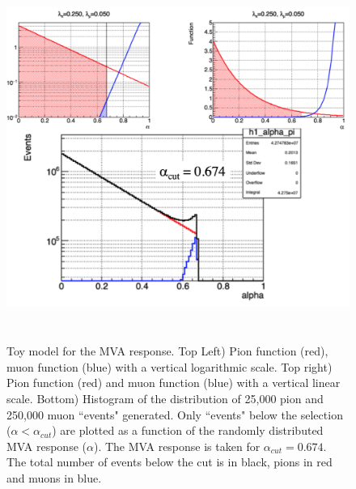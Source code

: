\documentclass[12pt]{article}
\begin{document}
\begin{figure}[tbph]
\begin{center}
\includegraphics[height=12cm,clip=true]{toy_systematics_c1}
\caption{Toy model for the MVA response. Top Left) Pion function (red), muon function (blue) with a vertical logarithmic scale. 
Top right) Pion function (red) and muon function (blue) with a vertical linear scale.
Bottom) Histogram of the distribution of 25,000 pion and 250,000 muon ``events" generated. Only ``events" below the selection ($\alpha < \alpha_{cut}$) 
are plotted as a function of the randomly distributed MVA response ($\alpha$). The MVA response is taken for $\alpha_{cut}=0.674$. 
The total number of events below the cut is in black, pions in red and muons in blue.
\label{fig:toy_systematics_c1}}
\end{center}
\end{figure} 
\end{document}
